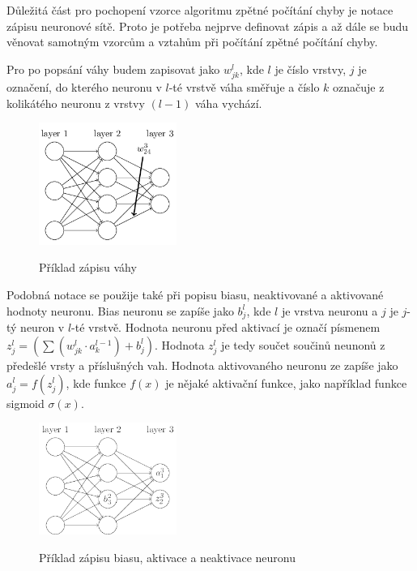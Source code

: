 Důležitá část pro pochopení vzorce algoritmu zpětné počítání chyby je notace zápisu neuronové sítě.
Proto je potřeba nejprve definovat zápis a až dále se budu věnovat samotným vzorcům a vztahům při počítání zpětné počítání chyby.

Pro po popsání váhy budem zapisovat jako \(w_{jk}^l\), kde \(l\) je číslo vrstvy, \(j\) je označení,
do kterého neuronu v \(l\)-té vrstvě váha směřuje a číslo \(k\) označuje z kolikátého neuronu z vrstvy \((l-1)\) váha vychází.

\begin{figure}[h]
    \centering
    \includegraphics[width=0.4\textwidth]{images/vaha_v_siti.png}
    \caption{Příklad zápisu váhy}\cite{vaha_v_siti}
\end{figure}

Podobná notace se použije také při popisu biasu, neaktivované a aktivované hodnoty neuronu.
Bias neuronu se zapíše jako \(b_{j}^l\), kde \(l\) je vrstva neuronu a \(j\) je \(j\)-tý neuron v \(l\)-té vrstvě.
Hodnota neuronu před aktivací je označí písmenem \(z_{j}^{l} = \left( \sum (w^{l}_{jk} \cdot a^{l-1}_k) + b^l_j \right)\).
Hodnota \(z_j^l\) je tedy součet součinů neunonů z předešlé vrsty a příslušných vah.
Hodnota aktivovaného neuronu ze zapíše jako \(a_j^l = f(z_j^l)\), kde funkce \(f(x)\) je nějaké aktivační funkce,
jako například funkce sigmoid \(\sigma(x)\).

\begin{figure}[h]
    \centering
    \includegraphics[width=0.4\textwidth]{images/bias_a_neuron.png}
    \caption{Příklad zápisu biasu, aktivace a neaktivace neuronu} \cite{bias_a_neuron}
\end{figure}

